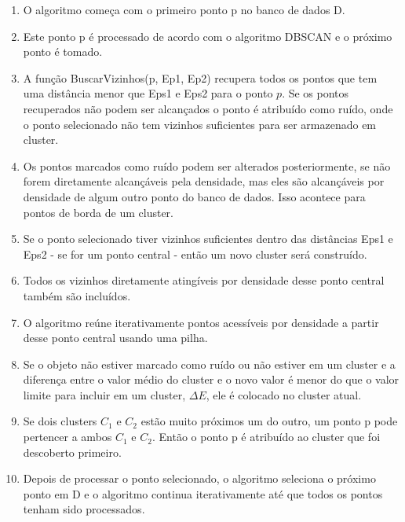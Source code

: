 \begin{enumerate}
	\item O algoritmo começa com o primeiro ponto p no banco de dados D.
	\item Este ponto p é processado de acordo com o algoritmo DBSCAN e o próximo ponto é tomado.
	\item A função BuscarVizinhos(p, Ep1, Ep2) recupera todos os pontos que tem uma distância menor que Eps1 e Eps2 para o ponto ${p}$. Se os pontos recuperados não podem ser alcançados o ponto é atribuído como ruído, onde o ponto selecionado não tem vizinhos suficientes para ser armazenado em cluster.
	\item Os pontos marcados como ruído podem ser alterados posteriormente, se não forem diretamente alcançáveis pela densidade, mas eles são alcançáveis por densidade de algum outro ponto do banco de dados. Isso acontece para pontos de borda de um cluster.
	\item Se o ponto selecionado tiver vizinhos suficientes dentro das distâncias Eps1 e Eps2 - se for um ponto central - então um novo cluster será construído.
	\item Todos os vizinhos diretamente atingíveis por densidade desse ponto central também são incluídos.
	\item O algoritmo reúne iterativamente pontos acessíveis por densidade a partir desse ponto central usando uma pilha.
	\item Se o objeto não estiver marcado como ruído ou não estiver em um cluster e a diferença entre o valor médio do cluster e o novo valor é menor do que o valor limite para incluir em um cluster, ${\Delta E}$, ele é colocado no cluster atual.
	\item Se dois clusters ${C_1}$ e ${C_2}$ estão muito próximos um do outro, um ponto p pode pertencer a ambos ${C_1}$ e ${C_2}$. Então o ponto p é atribuído ao cluster que foi descoberto primeiro.
	\item Depois de processar o ponto selecionado, o algoritmo seleciona o próximo ponto em D e o algoritmo continua iterativamente até que todos os pontos tenham sido processados.
\end{enumerate}

